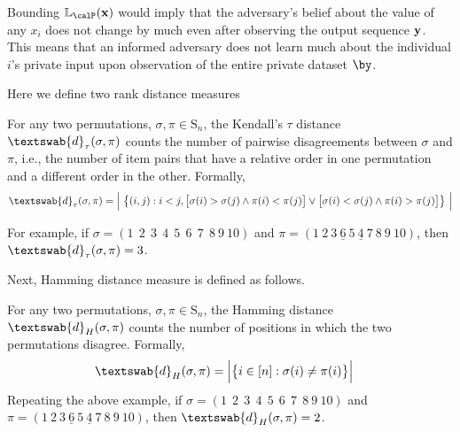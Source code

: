 Bounding  $\mathbb{L}_{\calP}(\mathbf{x})$  would imply
 that the adversary's belief about the value of any $x_i$ does not change by much even after observing the output sequence $\bf{y}$. This means that an informed adversary does not learn much about the individual $i$'s private input upon observation of the entire private dataset $\by$.

Here we define two rank distance measures \begin{defn} For any two permutations, $\sigma, \pi \in \mathrm{S}_n$, the Kendall's $\tau$
distance $\textswab{d}_{\tau}(\sigma, \pi)$ counts the number of pairwise disagreements between $\sigma$ and $\pi$, i.e., the
number of item pairs that have a relative order in one permutation and a different order in
the other. Formally, 
\begin{equation}
\textswab{d}_{\tau}(\sigma,\pi)=\Big| \ \big\{(i,j) : i < j,  \big[\sigma(i) > \sigma(j) \wedge \pi(i) < \pi(j) \big]\\\hspace{2cm} \\
		\vee \big[\sigma(i) < \sigma(j) \wedge \pi(i) > \pi(j)\big] \big\} \ \Big|\label{eq:kendalltau}
\end{equation}  
\label{def:kendall} 
\end{defn}
For example, if $\sigma=(1 \:\: 2 \: \: 3 \: \: 4 \:  \: 5 \: \: 6 \: \: 7 \: \: 8 \: 9 \: 10)$ and  $\pi=(1\:2\:3\:\underline{6} \: 5 \: \underline{4}\:7\:8\:9\:10)$, then $\textswab{d}_{\tau}(\sigma,\pi)=3$.

 Next, Hamming distance measure is defined as follows.
 
\begin{defn} 
For any two permutations, $\sigma, \pi \in \mathrm{S}_n$, the Hamming distance $\textswab{d}_{H}(\sigma, \pi)$ counts the number of positions in which the two permutations disagree. Formally, 
\begin{align*}
    \textswab{d}_H(\sigma, \pi)
    &= \Big| \big\{ i \in [n] : \sigma(i) \neq \pi(i) \big\} \Big| 
\end{align*}
Repeating the above example, if $\sigma=(1 \:\: 2 \: \: 3 \: \: 4 \:  \: 5 \: \: 6 \: \: 7 \: \: 8 \: 9 \: 10)$ and  $\pi=(1 \: 2 \: 3 \: \underline{6} \: 5 \: \underline{4} \: 7 \: 8 \: 9 \: 10)$, then $\textswab{d}_{H}(\sigma,\pi)=2$.
\end{defn}

